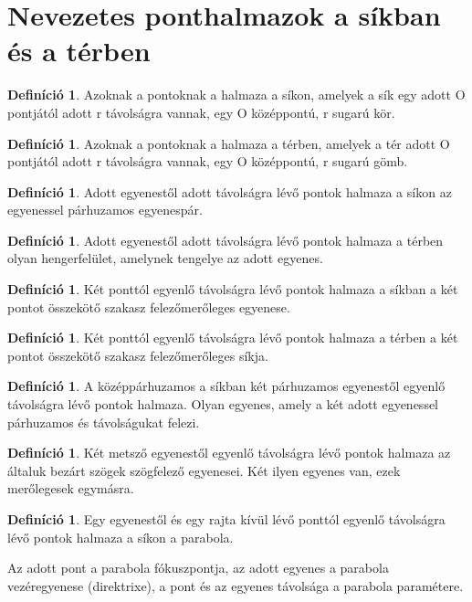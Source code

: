 \documentclass[twoside,12pt]{report}
\theoremstyle{definition}
\newtheorem{definition}[theorem]{Definíció}
\begin{document}
\section{Nevezetes ponthalmazok a síkban és a térben}
	\begin{definition}
		Azoknak a pontoknak a halmaza a síkon, amelyek a sík egy adott O pontjától adott
		r távolságra vannak, egy O középpontú, r sugarú kör.
	\end{definition}
	\begin{definition}
		Azoknak a pontoknak a halmaza a térben, amelyek a tér adott O pontjától adott r távolságra
		vannak, egy O középpontú, r sugarú gömb.
	\end{definition}
	\begin{definition}
		Adott egyenestől adott távolságra lévő pontok halmaza a síkon az egyenessel párhuzamos
		egyenespár.
	\end{definition}
	\begin{definition}
		Adott egyenestől adott távolságra lévő pontok halmaza a térben olyan hengerfelület,
		amelynek tengelye az adott egyenes.
	\end{definition}
	\begin{definition}
		Két ponttól egyenlő távolságra lévő pontok halmaza a síkban a két pontot összekötő szakasz felezőmerőleges	egyenese.
	\end{definition}
	\begin{definition}
		Két ponttól egyenlő távolságra lévő pontok halmaza a térben a két pontot összekötő szakasz felezőmerőleges síkja.
	\end{definition}
	\begin{definition}
		A középpárhuzamos a síkban két párhuzamos egyenestől egyenlő távolságra lévő pontok halmaza. Olyan egyenes, amely a két adott egyenessel párhuzamos és távolságukat felezi.
	\end{definition}
	\begin{definition}
		Két metsző egyenestől egyenlő távolságra lévő pontok halmaza az általuk bezárt szögek
		szögfelező egyenesei. Két ilyen egyenes van, ezek merőlegesek egymásra.
	\end{definition}
	\begin{definition}
		Egy egyenestől és egy rajta kívül lévő ponttól egyenlő távolságra lévő pontok halmaza
		a síkon a parabola.
	\end{definition}
	Az adott pont a parabola fókuszpontja, az adott egyenes a parabola vezéregyenese (direktrixe),
	a pont és az egyenes távolsága a parabola paramétere.
\end{document}

